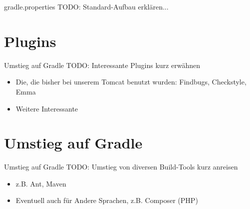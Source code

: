 \documentclass[newPxFont,numfooter,sectionpages,notes]{beamer}
\begin{document}
\begin{frame}{gradle.properties}
TODO: Standard-Aufbau erklären...
\end{frame}

\section{Plugins}

\begin{frame}{Umstieg auf Gradle}
TODO: Interessante Plugins kurz erwähnen
\begin{itemize}
	\item Die, die bisher bei unserem Tomcat benutzt wurden: Findbugs, Checkstyle, Emma
	\item Weitere Interessante
\end{itemize}

\end{frame}

\section{Umstieg auf Gradle}

\begin{frame}{Umstieg auf Gradle}
TODO: Umstieg von diversen Build-Tools kurz anreisen
\begin{itemize}
	\item z.B. Ant, Maven
	\item Eventuell auch für Andere Sprachen, z.B. Composer (PHP)
\end{itemize}

\end{frame}


\begingroup
{}
\begin{frame}[plain]


\end{frame}
\endgroup
\end{document}
